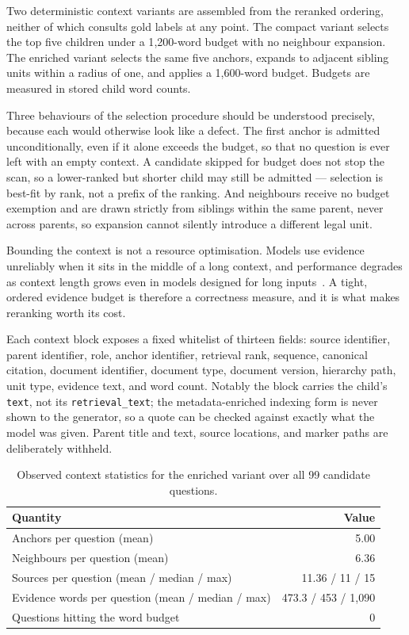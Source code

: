 Two deterministic context variants are assembled from the reranked ordering, neither of which consults gold labels at any point. The compact variant selects the top five children under a 1{,}200-word budget with no neighbour expansion. The enriched variant selects the same five anchors, expands to adjacent sibling units within a radius of one, and applies a 1{,}600-word budget. Budgets are measured in stored child word counts.

Three behaviours of the selection procedure should be understood precisely, because each would otherwise look like a defect. The first anchor is admitted unconditionally, even if it alone exceeds the budget, so that no question is ever left with an empty context. A candidate skipped for budget does not stop the scan, so a lower-ranked but shorter child may still be admitted --- selection is best-fit by rank, not a prefix of the ranking. And neighbours receive no budget exemption and are drawn strictly from siblings within the same parent, never across parents, so expansion cannot silently introduce a different legal unit.

Bounding the context is not a resource optimisation. Models use evidence unreliably when it sits in the middle of a long context, and performance degrades as context length grows even in models designed for long inputs~\cite{liu2024lostmiddle}. A tight, ordered evidence budget is therefore a correctness measure, and it is what makes reranking worth its cost.

Each context block exposes a fixed whitelist of thirteen fields: source identifier, parent identifier, role, anchor identifier, retrieval rank, sequence, canonical citation, document identifier, document type, document version, hierarchy path, unit type, evidence text, and word count. Notably the block carries the child's \texttt{text}, not its \texttt{retrieval\_text}; the metadata-enriched indexing form is never shown to the generator, so a quote can be checked against exactly what the model was given. Parent title and text, source locations, and marker paths are deliberately withheld.

\begin{table}[htbp]
  \centering
  \caption{Observed context statistics for the enriched variant over all 99 candidate questions.}
  \label{tab:context-stats}
  \begin{tabular}{lr}
    \toprule
    \textbf{Quantity} & \textbf{Value} \\
    \midrule
    Anchors per question (mean) & 5.00 \\
    Neighbours per question (mean) & 6.36 \\
    Sources per question (mean / median / max) & 11.36 / 11 / 15 \\
    Evidence words per question (mean / median / max) & 473.3 / 453 / 1,090 \\
    Questions hitting the word budget & 0 \\
    \bottomrule
  \end{tabular}
\end{table}

